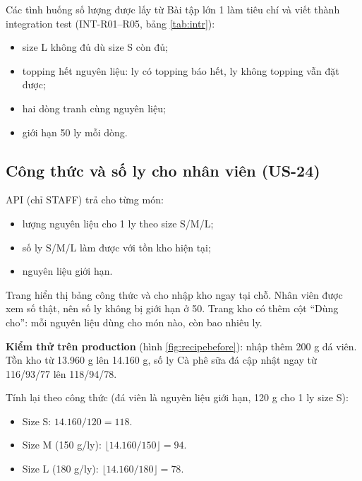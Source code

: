 Các tình huống số lượng được lấy từ Bài tập lớn 1 làm tiêu chí và viết thành integration test (INT-R01--R05, bảng \ref{tab:intr}):
\begin{itemize}
\item size L không đủ dù size S còn đủ;
\item topping hết nguyên liệu: ly có topping báo hết, ly không topping vẫn đặt được;
\item hai dòng tranh cùng nguyên liệu;
\item giới hạn 50 ly mỗi dòng.
\end{itemize}


\subsection{Công thức và số ly cho nhân viên (US-24)}
API  (chỉ STAFF) trả cho từng món:
\begin{itemize}
\item lượng nguyên liệu cho 1 ly theo size S/M/L;
\item số ly S/M/L làm được với tồn kho hiện tại;
\item nguyên liệu giới hạn.
\end{itemize}

Trang  hiển thị bảng công thức và cho nhập kho ngay tại chỗ. Nhân viên được xem số thật, nên số ly không bị giới hạn ở 50. Trang kho  có thêm cột ``Dùng cho'': mỗi nguyên liệu dùng cho món nào, còn bao nhiêu ly.

\textbf{Kiểm thử trên production} (hình \ref{fig:recipebefore}): nhập thêm 200 g đá viên. Tồn kho từ 13.960 g lên 14.160 g, số ly Cà phê sữa đá cập nhật ngay từ 116/93/77 lên 118/94/78.

Tính lại theo công thức (đá viên là nguyên liệu giới hạn, 120 g cho 1 ly size S):
\begin{itemize}
\item Size S: $14.160 / 120 = 118$.
\item Size M (150 g/ly): $\lfloor 14.160 / 150 \rfloor = 94$.
\item Size L (180 g/ly): $\lfloor 14.160 / 180 \rfloor = 78$.
\end{itemize}

